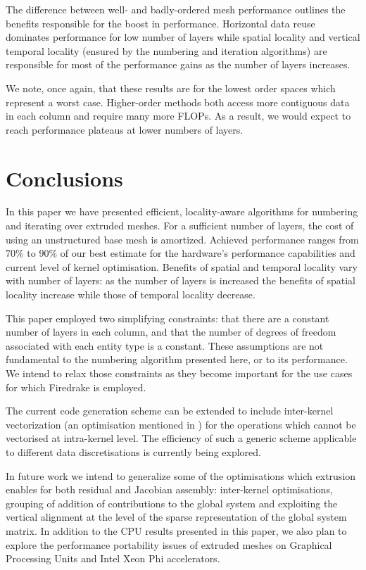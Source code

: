 \documentclass[11pt, a4paper]{scrartcl}
\begin{document}
The difference between well- and badly-ordered mesh performance
outlines the benefits responsible for the boost in
performance. Horizontal data reuse dominates performance for low
number of layers while spatial locality and vertical temporal locality
(ensured by the numbering and iteration algorithms) are responsible
for most of the performance gains as the number of layers increases.

We note, once again, that these results are for the lowest order
spaces which represent a worst case.  Higher-order methods both access
more contiguous data in each column and require many more FLOPs.  As a
result, we would expect to reach performance plateaus at lower numbers
of layers.

\section{Conclusions}
\label{sec:conclusions}
In this paper we have presented efficient, locality-aware algorithms
for numbering and iterating over extruded meshes. For a sufficient
number of layers, the cost of using an unstructured base mesh is
amortized. Achieved performance ranges from 70\% to 90\% of our best
estimate for the hardware's performance capabilities and current level
of kernel optimisation.  Benefits of spatial and temporal locality
vary with number of layers: as the number of layers is increased the
benefits of spatial locality increase while those of temporal locality
decrease.

This paper employed two simplifying constraints: that there are a
constant number of layers in each column, and that the number of
degrees of freedom associated with each entity type is a
constant. These assumptions are not fundamental to the numbering
algorithm presented here, or to its performance.  We intend to relax
those constraints as they become important for the use cases for which
Firedrake is employed.

The current code generation scheme can be extended to include
inter-kernel vectorization (an optimisation mentioned in
\citet{Meister:2015}) for the operations which cannot be vectorised at
intra-kernel level. The efficiency of such a generic scheme applicable
to different data discretisations is currently being explored.

In future work we intend to generalize some of the optimisations which
extrusion enables for both residual and Jacobian assembly:
inter-kernel optimisations, grouping of addition of contributions to
the global system and exploiting the vertical alignment at the level
of the sparse representation of the global system matrix. In addition
to the CPU results presented in this paper, we also plan to explore
the performance portability issues of extruded meshes on Graphical
Processing Units and Intel Xeon Phi accelerators.
\end{document}
